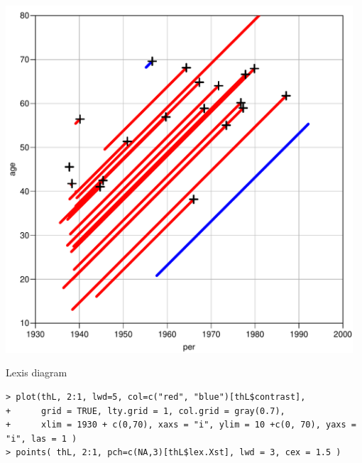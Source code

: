 \begin{frame}[fragile]
  \begin{minipage}[c]{0.50\linewidth}
\includegraphics[width=0.97\textwidth,keepaspectratio]{thL-lexis2}
  \end{minipage}
  \begin{minipage}[c]{0.48\linewidth}
\hfill \LARGE Lexis diagram
  \end{minipage}
\vspace*{-1.5ex}
{\scriptsize
\begin{verbatim}
> plot(thL, 2:1, lwd=5, col=c("red", "blue")[thL$contrast],
+      grid = TRUE, lty.grid = 1, col.grid = gray(0.7),
+      xlim = 1930 + c(0,70), xaxs = "i", ylim = 10 +c(0, 70), yaxs = "i", las = 1 )
> points( thL, 2:1, pch=c(NA,3)[thL$lex.Xst], lwd = 3, cex = 1.5 )
\end{verbatim}}
\end{frame}

